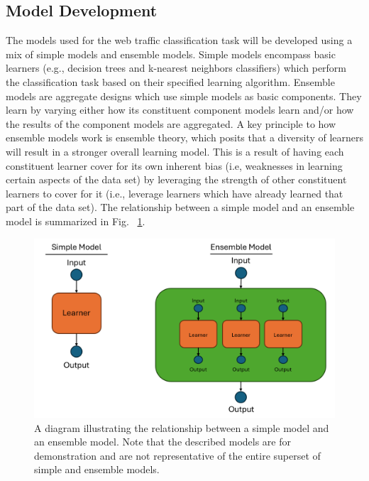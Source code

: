 \documentclass[10pt,sigconf,letterpaper,nonacm]{acmart}
\begin{document}
\subsection{Model Development}

The models used for the web traffic classification task will be developed using a mix of simple models and ensemble models.
Simple models encompass basic learners (e.g., decision trees and k-nearest neighbors classifiers) which perform the classification task based on their specified learning algorithm.
Ensemble models are aggregate designs which use simple models as basic components.
They learn by varying either how its constituent component models learn and/or how the results of the component models are aggregated.
A key principle to how ensemble models work is ensemble theory, which posits that a diversity of learners will result in a stronger overall learning model.
This is a result of having each constituent learner cover for its own inherent bias (i.e, weaknesses in learning certain aspects of the data set) by leveraging the strength of other constituent learners to cover for it (i.e., leverage learners which have already learned that part of the data set).
The relationship between a simple model and an ensemble model is summarized in Fig. ~\ref{fig:models}.

\begin{figure}[h]
  \centering
  \includegraphics[width=\linewidth]{img/models.png}
  \caption{A diagram illustrating the relationship between a simple model and an ensemble model. Note that the described models are for demonstration and are not representative of the entire superset of simple and ensemble models.}
  \label{fig:models}
\end{figure}
\end{document}
